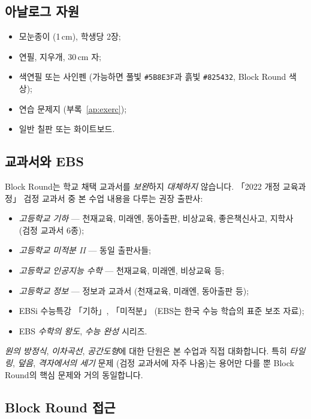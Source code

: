\documentclass[12pt,a4paper]{scrartcl}
\begin{document}
\subsection{아날로그 자원}
\begin{itemize}[leftmargin=1.3em,itemsep=0.15em,topsep=0.3em]
  \item 모눈종이 (1\,cm), 학생당 2장;
  \item 연필, 지우개, 30\,cm 자;
  \item 색연필 또는 사인펜 (가능하면 풀빛 \texttt{\#5B8E3F}과 흙빛 \texttt{\#825432}, Block Round 색상);
  \item 연습 문제지 (부록~\ref{ap:exerc});
  \item 일반 칠판 또는 화이트보드.
\end{itemize}

\subsection{교과서와 EBS}\label{sec:textbook}

Block Round는 학교 채택 교과서를 \emph{보완}하지 \emph{대체하지} 않습니다. 「2022 개정 교육과정」 검정 교과서 중 본 수업 내용을 다루는 권장 출판사:

\begin{itemize}[leftmargin=1.3em,itemsep=0.1em,topsep=0.2em,nosep]
  \item \emph{고등학교 기하} --- 천재교육, 미래엔, 동아출판, 비상교육, 좋은책신사고, 지학사 (검정 교과서 6종);
  \item \emph{고등학교 미적분 II} --- 동일 출판사들;
  \item \emph{고등학교 인공지능 수학} --- 천재교육, 미래엔, 비상교육 등;
  \item \emph{고등학교 정보} --- 정보과 교과서 (천재교육, 미래엔, 동아출판 등);
  \item EBSi 수능특강 「기하」, 「미적분」 (EBS는 한국 수능 학습의 표준 보조 자료);
  \item EBS \emph{수학의 왕도}, \emph{수능 완성} 시리즈.
\end{itemize}

\emph{원의 방정식}, \emph{이차곡선}, \emph{공간도형}에 대한 단원은 본 수업과 직접 대화합니다. 특히 \emph{타일링}, \emph{덮음}, \emph{격자에서의 세기} 문제 (검정 교과서에 자주 나옴)는 용어만 다를 뿐 Block Round의 핵심 문제와 거의 동일합니다.

\subsection{Block Round 접근}
\end{document}
